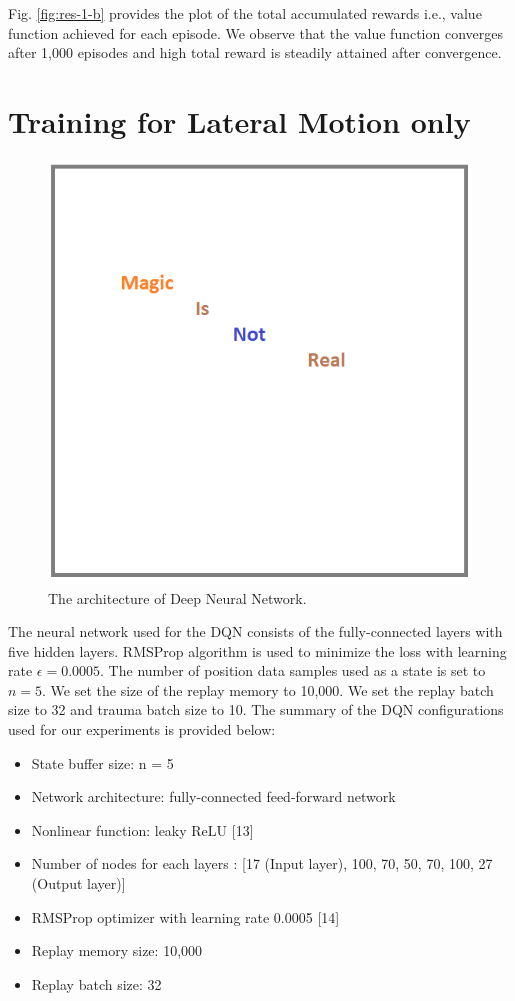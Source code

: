 Fig. \ref{fig:res-1-b} provides the plot of the total accumulated rewards i.e., value function achieved for each episode. We observe that the value function converges after 1,000 episodes and high total reward is steadily attained after convergence.

\section{Training for Lateral Motion only}

\begin{figure}[h]
\centering
\includegraphics[width=1.0\textwidth]{figs/magic}
\caption{The architecture of Deep Neural Network.}
\label{fig:dnn}
\end{figure}

The neural network used for the DQN consists of the fully-connected layers with five hidden layers. RMSProp algorithm is used to minimize the loss with learning rate $\epsilon = 0.0005$. The number of position data samples used as a state is set to $n = 5$. We set the size of the replay memory to 10,000. We set the replay batch size to 32 and trauma batch size to 10. The summary of the DQN configurations used for our experiments is provided below:

\begin{itemize}
\item State buffer size: n = 5
\item Network architecture: fully-connected feed-forward network
\item Nonlinear function: leaky ReLU [13]
\item Number of nodes for each layers : [17 (Input layer), 100, 70, 50, 70, 100, 27 (Output layer)]
\item RMSProp optimizer with learning rate 0.0005 [14]
\item Replay memory size: 10,000
\item Replay batch size: 32
\end{itemize}

